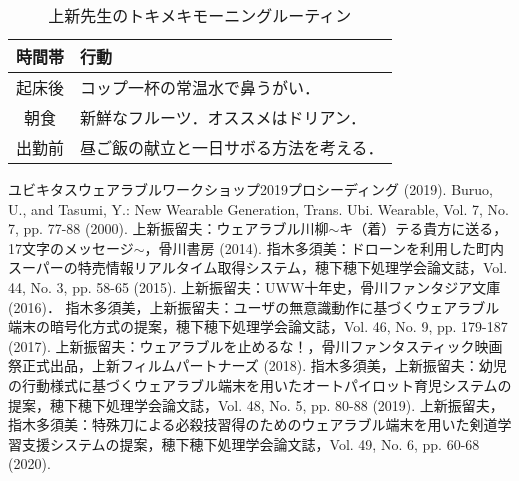 \documentclass[a4j]{jarticle}%
\begin{document}
\begin{table}[h]
  \begin{center}
    \caption{上新先生のトキメキモーニングルーティン}
    \label{table1}
    \begin{tabular}{c|l}\hline\hline
      時間帯 & 行動                                   \\\hline
      起床後 & コップ一杯の常温水で鼻うがい．         \\
      朝食   & 新鮮なフルーツ．オススメはドリアン．   \\
      出勤前 & 昼ご飯の献立と一日サボる方法を考える． \\\hline
    \end{tabular}
  \end{center}
\end{table}

\begin{thebibliography}{10}

   ユビキタスウェアラブルワークショップ2019プロシーディング (2019).
   Buruo, U., and Tasumi, Y.: New Wearable Generation, Trans. Ubi. Wearable, Vol. 7, No. 7, pp. 77-88 (2000).
   上新振留夫：ウェアラブル川柳$\sim$キ（着）テる貴方に送る，17文字のメッセージ$\sim$，骨川書房 (2014).
   指木多須美：ドローンを利用した町内スーパーの特売情報リアルタイム取得システム，穂下穂下処理学会論文誌，Vol. 44, No. 3, pp. 58-65 (2015).
   上新振留夫：UWW十年史，骨川ファンタジア文庫 (2016)．
   指木多須美，上新振留夫：ユーザの無意識動作に基づくウェアラブル端末の暗号化方式の提案，穂下穂下処理学会論文誌，Vol. 46, No. 9, pp. 179-187 (2017).
   上新振留夫：ウェアラブルを止めるな！，骨川ファンタスティック映画祭正式出品，上新フィルムパートナーズ (2018).
   指木多須美，上新振留夫：幼児の行動様式に基づくウェアラブル端末を用いたオートパイロット育児システムの提案，穂下穂下処理学会論文誌，Vol. 48, No. 5, pp. 80-88 (2019).
   上新振留夫，指木多須美：特殊刀による必殺技習得のためのウェアラブル端末を用いた剣道学習支援システムの提案，穂下穂下処理学会論文誌，Vol. 49, No. 6, pp. 60-68 (2020).
\end{thebibliography}
\end{document}
